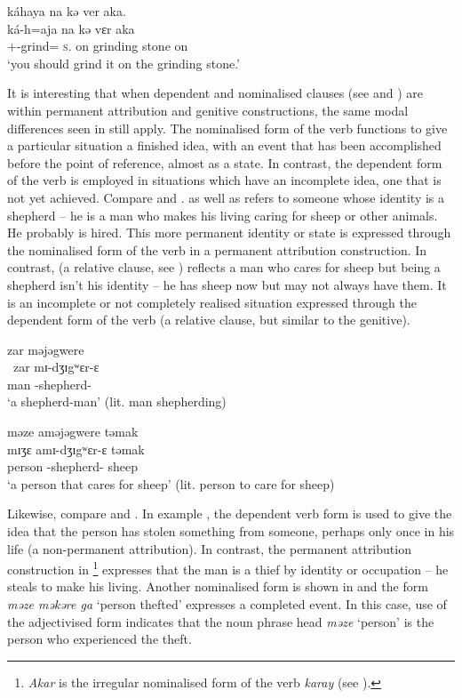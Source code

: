 \medskip
      káhaya  na  kə  ver  aka.\\
\gll  ká-h=aja na kə vɛr aka\\
      {\twoS}+{\IFV}-grind={\PLU}    \textsc{s}.{\DO}     on  {grinding stone}  on\\
\glt  ‘you should grind it on the grinding stone.’
\z

It is interesting that when dependent and nominalised clauses (see  and ) are within permanent attribution  and genitive constructions, the same modal differences seen in  still apply. The nominalised form of the verb functions to give a particular situation a finished idea, with an event that has been accomplished before the point of reference, almost as a state. In contrast, the dependent form of the verb is employed in situations which have an incomplete idea, one that is not yet achieved. Compare  and .  as well as  refers to someone whose identity is a shepherd -- he is a man who makes his living caring for sheep or other animals. He probably is hired. This more permanent identity or state is expressed through the nominalised form of the verb in a permanent attribution construction. In contrast,  (a relative clause, see ) reflects a man who cares for sheep but being a shepherd isn’t his identity -- he has sheep now but may not always have them. It is an incomplete or not completely realised situation expressed through the dependent form of the verb (a relative clause, but similar to the genitive). 

\ea \label{ex:5:94}
zar  məjəgwere\\
\gll  \ zar     mɪ-dʒɪgʷɛr-ɛ\\
      man    {\NOM}{}-shepherd-{\CL}\\
\glt  ‘a shepherd-man’ (lit. man shepherding)
\z

\largerpage
\ea \label{ex:5:95}
məze  aməjəgwere  təmak\\
\gll  mɪʒɛ   amɪ-dʒɪgʷɛr-ɛ     təmak\\
      person  {\DEP}-shepherd-{\CL}  sheep\\
\glt  ‘a person that cares for sheep’ (lit. person to care for sheep)
\z

Likewise, compare  and . In example , the dependent verb form is used to give the idea that the person has stolen something from someone, perhaps only once in his life (a non-permanent attribution).  In contrast, the permanent attribution construction in \footnote{\textit{Akar} is the irregular nominalised form of the verb \textit{karay} (see ).} expresses that the man is a thief by identity or occupation -- he steals to make his living. Another nominalised form is shown in  and the form \textit{məze məkəre  ga} ‘person thefted' expresses a completed event. In this case, use of the adjectivised form indicates that the noun phrase head \textit{məze} ‘person'  is the person who experienced the theft.  

